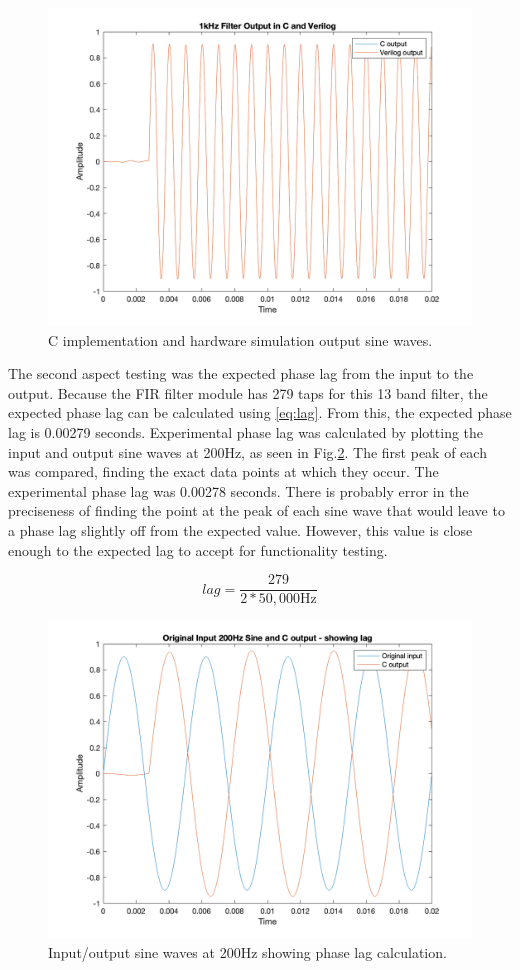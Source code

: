 \documentclass[journal]{IEEEtran} %
\begin{document}
\begin{figure}[htbp]
\centering
\includegraphics[width=0.9\linewidth]{Figures/EQ/CvsVerilog_output.png}
\caption{\label{fig:CvV}C implementation and hardware simulation output sine waves.}
\end{figure}

The second aspect testing was the expected phase lag from the input to the output. Because the FIR filter module has 279 taps for this 13 band filter, the expected phase lag can be calculated using \eqref{eq:lag}. From this, the expected phase lag is 0.00279 seconds. Experimental phase lag was calculated by plotting the input and output sine waves at 200Hz, as seen in Fig.\ref{fig:lag}. The first peak of each was compared, finding the exact data points at which they occur. The experimental phase lag was 0.00278 seconds. There is probably error in the preciseness of finding the point at the peak of each sine wave that would leave to a phase lag slightly off from the expected value. However, this value is close enough to the expected lag to accept for functionality testing.

\begin{equation}
    lag = \frac{279}{2*50,000\text{Hz}}
    \label{eq:lag}
\end{equation}{}

\begin{figure}[htbp]
\centering
\includegraphics[width=0.9\linewidth]{Figures/EQ/outputLag.png}
\caption{\label{fig:lag}Input/output sine waves at 200Hz showing phase lag calculation.}
\end{figure}
\end{document}
